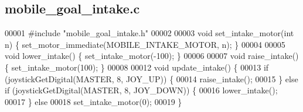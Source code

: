 \subsection{mobile\+\_\+goal\+\_\+intake.\+c}
\label{mobile__goal__intake_8c_source}

\begin{DoxyCode}
00001 \textcolor{preprocessor}{#include "mobile_goal_intake.h"}
00002 
00003 \textcolor{keywordtype}{void} set_intake_motor(\textcolor{keywordtype}{int} n) \{ set_motor_immediate(MOBILE\_INTAKE\_MOTOR, n); \}
00004 
00005 \textcolor{keywordtype}{void} lower_intake() \{ set_intake_motor(-100); \}
00006 
00007 \textcolor{keywordtype}{void} raise_intake() \{ set_intake_motor(100); \}
00008 
00012 \textcolor{keywordtype}{void} update_intake() \{
00013   \textcolor{keywordflow}{if} (joystickGetDigital(MASTER, 8, JOY\_UP)) \{
00014     raise_intake();
00015   \} \textcolor{keywordflow}{else} \textcolor{keywordflow}{if} (joystickGetDigital(MASTER, 8, JOY\_DOWN)) \{
00016     lower_intake();
00017   \} \textcolor{keywordflow}{else}
00018     set_intake_motor(0);
00019 \}
\end{DoxyCode}
